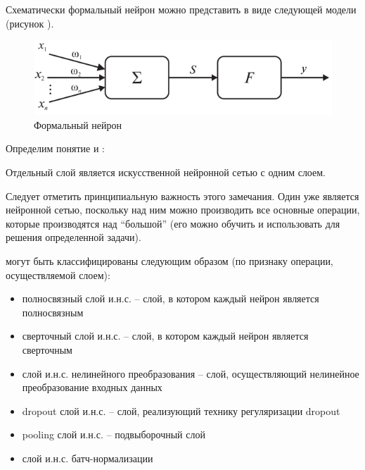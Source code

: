 Схематически формальный нейрон можно представить в виде следующей модели (рисунок \textit{}).

\begin{figure}[H]
	\includegraphics[scale=0.8]{author/part3/figures/formal_neuron.png}
	\caption{Формальный нейрон}
	\label{fig:formal_neuron}
\end{figure}

Определим понятие  и :

\begin{SCn}
\end{SCn}


\begin{SCn}
\end{SCn}

Отдельный слой является искусственной нейронной сетью с одним слоем.

Следует отметить принципиальную важность этого замечания. Один   уже является нейронной сетью, поскольку над ним можно производить все основные операции, которые производятся над ``большой''  (его можно обучить и использовать для решения определенной задачи).

 могут быть классифицированы следующим образом (по признаку операции, осуществляемой слоем):
\begin{itemize}
		\item полносвязный слой и.н.с. -- слой, в котором каждый нейрон является полносвязным
		\item сверточный слой и.н.с. -- слой, в котором каждый нейрон является сверточным
		\item слой и.н.с. нелинейного преобразования -- слой, осуществляющий нелинейное преобразование входных данных
		\item dropout слой и.н.с. -- слой, реализующий технику регуляризации dropout
		\item pooling слой и.н.с. -- подвыборочный слой
		\item слой и.н.с. батч-нормализации
\end{itemize}

